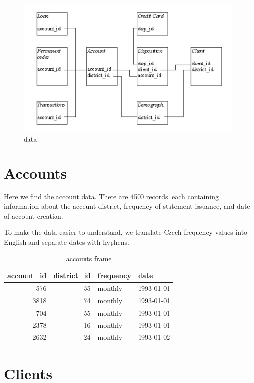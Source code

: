 \documentclass[]{book}
\begin{document}
\begin{figure}
\centering
\includegraphics{dados.png}
\caption{data}
\end{figure}

\section{Accounts}\label{accounts}

Here we find the account data. There are 4500 records, each containing
information about the account district, frequency of statement issuance,
and date of account creation.

To make the data easier to understand, we translate Czech frequency
values into English and separate dates with hyphens.

\begin{table}[t]

\caption{\label{tab:unnamed-chunk-4}accounts frame}
\centering
\begin{tabular}{r|r|l|l}
\hline
account\_id & district\_id & frequency & date\\
\hline
576 & 55 & monthly & 1993-01-01\\
\hline
3818 & 74 & monthly & 1993-01-01\\
\hline
704 & 55 & monthly & 1993-01-01\\
\hline
2378 & 16 & monthly & 1993-01-01\\
\hline
2632 & 24 & monthly & 1993-01-02\\
\hline
\end{tabular}
\end{table}

\section{Clients}\label{clients}
\end{document}
